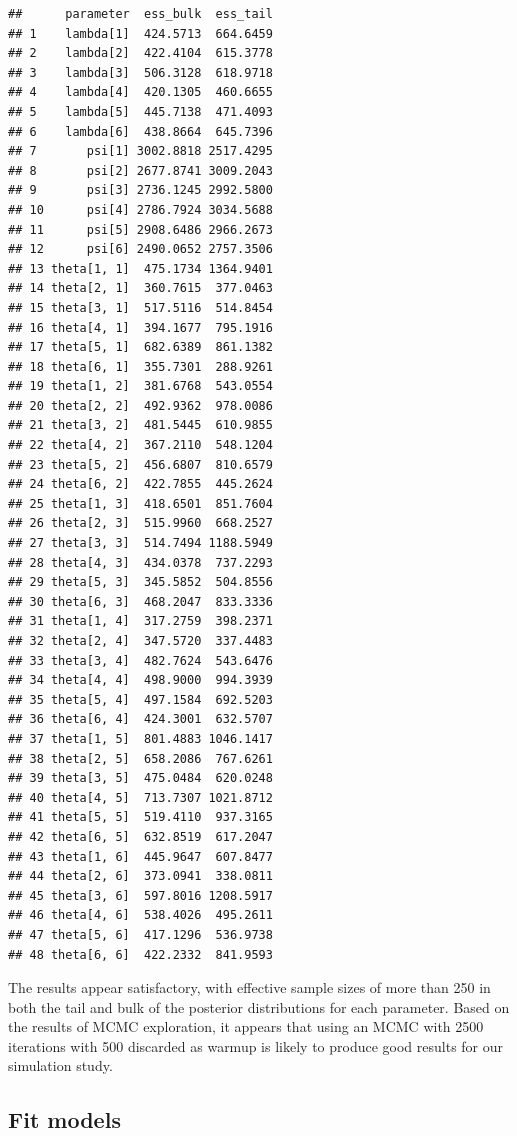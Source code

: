 \documentclass[
]{article}
\begin{document}
\begin{verbatim}
##      parameter  ess_bulk  ess_tail
## 1    lambda[1]  424.5713  664.6459
## 2    lambda[2]  422.4104  615.3778
## 3    lambda[3]  506.3128  618.9718
## 4    lambda[4]  420.1305  460.6655
## 5    lambda[5]  445.7138  471.4093
## 6    lambda[6]  438.8664  645.7396
## 7       psi[1] 3002.8818 2517.4295
## 8       psi[2] 2677.8741 3009.2043
## 9       psi[3] 2736.1245 2992.5800
## 10      psi[4] 2786.7924 3034.5688
## 11      psi[5] 2908.6486 2966.2673
## 12      psi[6] 2490.0652 2757.3506
## 13 theta[1, 1]  475.1734 1364.9401
## 14 theta[2, 1]  360.7615  377.0463
## 15 theta[3, 1]  517.5116  514.8454
## 16 theta[4, 1]  394.1677  795.1916
## 17 theta[5, 1]  682.6389  861.1382
## 18 theta[6, 1]  355.7301  288.9261
## 19 theta[1, 2]  381.6768  543.0554
## 20 theta[2, 2]  492.9362  978.0086
## 21 theta[3, 2]  481.5445  610.9855
## 22 theta[4, 2]  367.2110  548.1204
## 23 theta[5, 2]  456.6807  810.6579
## 24 theta[6, 2]  422.7855  445.2624
## 25 theta[1, 3]  418.6501  851.7604
## 26 theta[2, 3]  515.9960  668.2527
## 27 theta[3, 3]  514.7494 1188.5949
## 28 theta[4, 3]  434.0378  737.2293
## 29 theta[5, 3]  345.5852  504.8556
## 30 theta[6, 3]  468.2047  833.3336
## 31 theta[1, 4]  317.2759  398.2371
## 32 theta[2, 4]  347.5720  337.4483
## 33 theta[3, 4]  482.7624  543.6476
## 34 theta[4, 4]  498.9000  994.3939
## 35 theta[5, 4]  497.1584  692.5203
## 36 theta[6, 4]  424.3001  632.5707
## 37 theta[1, 5]  801.4883 1046.1417
## 38 theta[2, 5]  658.2086  767.6261
## 39 theta[3, 5]  475.0484  620.0248
## 40 theta[4, 5]  713.7307 1021.8712
## 41 theta[5, 5]  519.4110  937.3165
## 42 theta[6, 5]  632.8519  617.2047
## 43 theta[1, 6]  445.9647  607.8477
## 44 theta[2, 6]  373.0941  338.0811
## 45 theta[3, 6]  597.8016 1208.5917
## 46 theta[4, 6]  538.4026  495.2611
## 47 theta[5, 6]  417.1296  536.9738
## 48 theta[6, 6]  422.2332  841.9593
\end{verbatim}

\linespread{1}

The results appear satisfactory, with effective sample sizes of more than 250 in both the tail and bulk of the posterior distributions for each parameter. Based on the results of MCMC exploration, it appears that using an MCMC with 2500 iterations with 500 discarded as warmup is likely to produce good results for our simulation study.

\subsection{Fit models}\label{fit-models}
\end{document}

